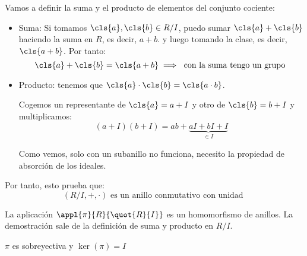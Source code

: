 Vamos a definir la suma y el producto de elementos del conjunto cociente:

\begin{itemize}
	\item Suma: Si tomamos $\cls{a}, \cls{b} \in R/I$, puedo sumar $\cls{a}+\cls{b}$ haciendo la suma en $R$, es decir, $a+b$. y luego tomando la clase, es decir, $\cls{a+b}$. Por tanto:
	$$ \cls{a}+\cls{b} = \cls{a+b} \implies \text{ con la suma tengo un grupo }$$
	\item Producto: tenemos que $ \cls{a}\cdot\cls{b} = \cls{a\cdot b} $.

	Cogemos un representante de $\cls{a}=a+I$ y otro de $\cls{b}=b+I$ y multiplicamos:
	$$ (a+I)(b+I)=ab+\underbrace{aI+bI+I}_{\in I} $$

	Como vemos, solo con un subanillo no funciona, necesito la propiedad de absorción de los ideales.
\end{itemize}

Por tanto, esto prueba que:
$$(R/I,+,\cdot) \text{ es un anillo conmutativo con unidad }$$

\begin{prop}
	La aplicación $\appl{\pi}{R}{\quot{R}{I}}$ es un homomorfismo de anillos. La demostración sale de la definición de suma y producto en $R/I$.
\end{prop}

\obs $\pi$ es sobreyectiva y $\ker(\pi)=I$

